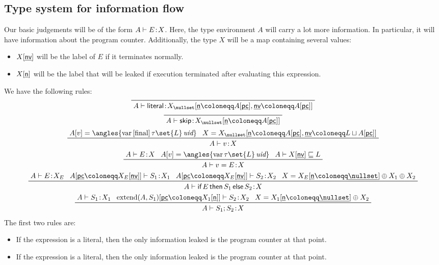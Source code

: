 \documentclass[class=scrartcl]{standalone}
\begin{document}
\subsection{Type system for information flow}
Our basic judgements will be of the form \(A \vdash E {\hspace{0.1111em}:\hspace{0.1111em}} X\).
Here, the type environment \(A\) will carry a lot more information.
In particular, it will have information about the program counter.
Additionally, the type \(X\) will be a map containing several values:
\begin{itemize}[nosep]
  \item \(X[\ulsf{nv}]\) will be the label of \(E\)
        if it terminates normally.
  \item \(X[\ulsf{n}]\) will be the label that will be leaked if
        execution terminated after evaluating this expression.
\end{itemize}
We have the following rules:
\begin{gather*}
  \prfaxiom{A \vdash \textsf{literal} \of
                       X_\nullset[ \ulsf{n} \coloneqq A[\ulsf{pc}]
                                 , \ulsf{nv} \coloneqq A[\ulsf{pc} ]]} \\[0.5ex]
  \prfaxiom{A \vdash
            \pskip \of X_\nullset[ \ulsf{n} \coloneqq A[\ulsf{pc} ]]} \\[0.5ex]
  \prftree{A[v] = \angles{ \textrm{var}
                        \, [\textrm{final}]
                        \, \tau\set{L}
                        \, \textit{uid}} }
          {X = X_\nullset[ \ulsf{n} \coloneqq A[\ulsf{pc}]
                         , \ulsf{nv} \coloneqq L \sqcup A[\ulsf{pc}]
          ]}
          {A \vdash v \of X} \\
  \prftree{A \vdash E \of X}
          {A[v] = \angles{ \textrm{var}
                        \, \tau\set{L}
                        \, \textit{uid} }}
          {A \vdash X[\ulsf{nv}] \sqsubseteq L}
          {A \vdash v = E \of X} \\
  \prftree{A \vdash E \of X_E}
          {A[\ulsf{pc} \coloneqq X_E[\ulsf{nv}]] \vdash S_1 \of X_1}
          {A[\ulsf{pc} \coloneqq X_E[\ulsf{nv}]] \vdash S_2 \of X_2}
          {X = X_E[\ulsf{n} \coloneqq \underline{\nullset}]
               \oplus X_1 \oplus X_2}
          {A \vdash \pifthenelse{E}{S_1}{S_2} \of X} \\
  \prftree{A \vdash S_1 \of X_1}
          {\operatorname{extend}(A, S_1)[\ulsf{pc} \coloneqq X_1[\ulsf{n}]]
             \vdash S_2 \of X_2}
          {X = X_1[\ulsf{n} \coloneqq \underline{\nullset}] \oplus X_2}
          {A \vdash S_1; S_2 \of X}
\end{gather*}
\TODO[]
The first two rules are:
\begin{itemize}[nosep]
  \item If the expression is a literal, then the only information leaked
        is the program counter at that point.
  \item If the expression is a literal, then the only information leaked
        is the program counter at that point.
\end{itemize}
\end{document}
